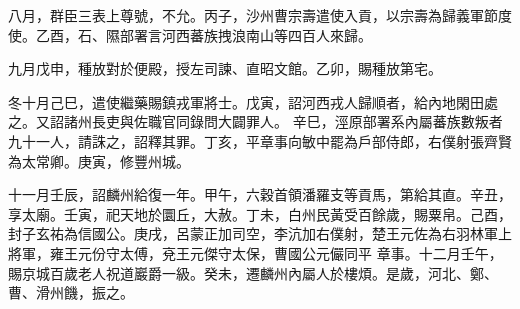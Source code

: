 \begin{pinyinscope}
 八月，群臣三表上尊號，不允。丙子，沙州曹宗壽遣使入貢，以宗壽為歸義軍節度使。乙酉，石、隰部署言河西蕃族拽浪南山等四百人來歸。



 九月戊申，種放對於便殿，授左司諫、直昭文館。乙卯，賜種放第宅。



 冬十月己巳，遣使繼藥賜鎮戎軍將士。戊寅，詔河西戎人歸順者，給內地閑田處之。又詔諸州長吏與佐職官同錄問大闢罪人。
 辛巳，涇原部署系內屬蕃族數叛者九十一人，請誅之，詔釋其罪。丁亥，平章事向敏中罷為戶部侍郎，右僕射張齊賢為太常卿。庚寅，修豐州城。



 十一月壬辰，詔麟州給復一年。甲午，六穀首領潘羅支等貢馬，第給其直。辛丑，享太廟。壬寅，祀天地於圜丘，大赦。丁未，白州民黃受百餘歲，賜粟帛。己酉，封子玄祐為信國公。庚戌，呂蒙正加司空，李沆加右僕射，楚王元佐為右羽林軍上將軍，雍王元份守太傅，兗王元傑守太保，曹國公元儼同平
 章事。十二月壬午，賜京城百歲老人祝道巖爵一級。癸未，遷麟州內屬人於樓煩。是歲，河北、鄭、曹、滑州饑，振之。



\end{pinyinscope}